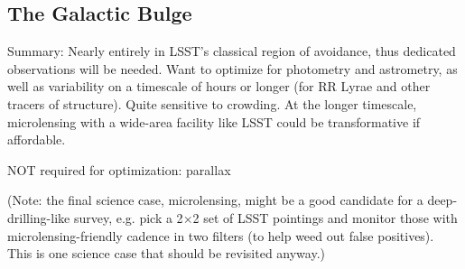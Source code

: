 



\subsection{The Galactic Bulge}

Summary: Nearly entirely in LSST’s classical region of avoidance, thus
dedicated observations will be needed. Want to optimize for photometry
and astrometry, as well as variability on a timescale of hours or
longer (for RR Lyrae and other tracers of structure). Quite sensitive
to crowding. At the longer timescale, microlensing with a wide-area
facility like LSST could be transformative if affordable.

NOT required for optimization: parallax

(Note: the final science case, microlensing, might be a good candidate
for a deep-drilling-like survey, e.g. pick a 2$\times$2 set of LSST
pointings and monitor those with microlensing-friendly cadence in two
filters (to help weed out false positives). This is one science case
that should be revisited anyway.)


